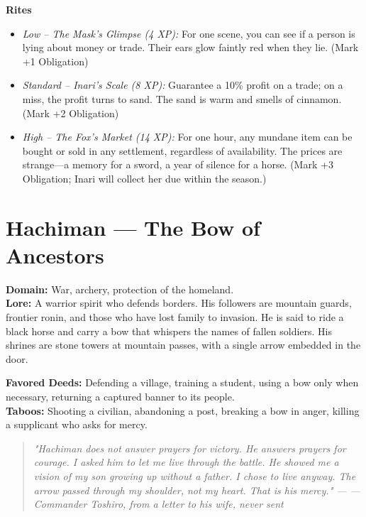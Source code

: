 \documentclass[12pt]{book}
\newcommand{\letter}[2]{%
    \begin{quote}\small\itshape #1 \hfill --- #2\end{quote}}
\begin{document}
\begin{infobox}
\textbf{Rites}
\begin{itemize}
    \item \textit{Low -- The Mask's Glimpse (4 XP):} For one scene, you can see if a person is lying about money or trade. Their ears glow faintly red when they lie. (Mark +1 Obligation)
    \item \textit{Standard -- Inari's Scale (8 XP):} Guarantee a 10\% profit on a trade; on a miss, the profit turns to sand. The sand is warm and smells of cinnamon. (Mark +2 Obligation)
    \item \textit{High -- The Fox's Market (14 XP):} For one hour, any mundane item can be bought or sold in any settlement, regardless of availability. The prices are strange---a memory for a sword, a year of silence for a horse. (Mark +3 Obligation; Inari will collect her due within the season.)
\end{itemize}
\end{infobox}

\section{Hachiman --- The Bow of Ancestors}
\noindent\textbf{Domain:} War, archery, protection of the homeland.\\
\textbf{Lore:} A warrior spirit who defends borders. His followers are mountain guards, frontier ronin, and those who have lost family to invasion. He is said to ride a black horse and carry a bow that whispers the names of fallen soldiers. His shrines are stone towers at mountain passes, with a single arrow embedded in the door.

\textbf{Favored Deeds:} Defending a village, training a student, using a bow only when necessary, returning a captured banner to its people.\\
\textbf{Taboos:} Shooting a civilian, abandoning a post, breaking a bow in anger, killing a supplicant who asks for mercy.

\letter{"Hachiman does not answer prayers for victory. He answers prayers for courage. I asked him to let me live through the battle. He showed me a vision of my son growing up without a father. I chose to live anyway. The arrow passed through my shoulder, not my heart. That is his mercy."}{--- Commander Toshiro, from a letter to his wife, never sent}
\end{document}
